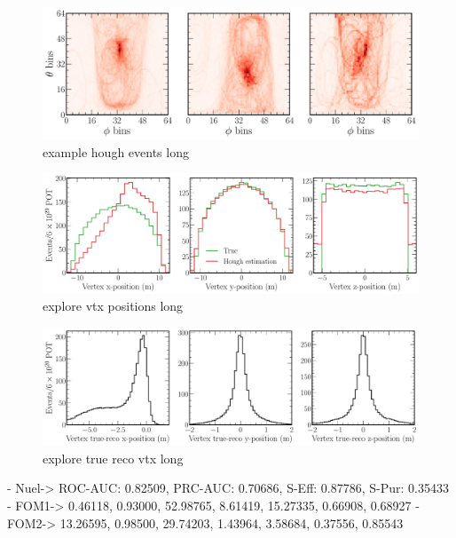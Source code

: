 \begin{figure} %
    \includegraphics[width=\textwidth]{diagrams/7-cvn/chipsnet/explore_hough_events.pdf}
    \caption[example hough events short]
    {example hough events long}
    \label{fig:example_hough_events}
\end{figure}

\begin{figure} %
    \includegraphics[width=\textwidth]{diagrams/7-cvn/chipsnet/explore_vtx_positions.pdf}
    \caption[explore vtx positions short]
    {explore vtx positions long}
    \label{fig:explore_vtx_positions}
\end{figure}

\begin{figure} %
    \includegraphics[width=\textwidth]{diagrams/7-cvn/chipsnet/explore_true_reco_vtx.pdf}
    \caption[explore true reco vtx short]
    {explore true reco vtx long}
    \label{fig:explore_true_reco_vtx}
\end{figure}

- Nuel-> ROC-AUC: 0.82509, PRC-AUC: 0.70686, S-Eff: 0.87786, S-Pur: 0.35433
- FOM1-> 0.46118, 0.93000, 52.98765, 8.61419, 15.27335, 0.66908, 0.68927
- FOM2-> 13.26595, 0.98500, 29.74203, 1.43964, 3.58684, 0.37556, 0.85543


